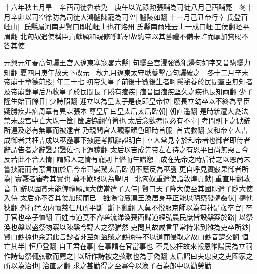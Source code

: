 十六年秋七月旱　辛酉司徒魯恭免　庚午以光祿勲張酺為司徒八月己酉酺薨　冬十月辛卯以司空徐防為司徒大鴻臚陳寵為司空|{
	臚陵如翻}
十一月己丑帝行幸氏登百岯山|{
	氏縣屬河南尹賢曰即柏岯山也在洛州氏縣南爾雅云山一成曰岯工侯翻岯平眉翻}
北匈奴遣使稱臣貢獻願和親修呼韓邪故約帝以其舊禮不備未許而厚加賞賜不答其使

元興元年春高句驪王宫入遼東塞寇畧六縣|{
	句驪至宫浸強數犯邊句如字又音駒驪力知翻}
夏四月庚午赦天下改元　秋九月遼東太守耿夔擊高句驪破之　冬十二月辛未帝崩于章德前殿|{
	年二十七}
初帝失皇子前後十數後生者輒隱袐養於民間羣臣無知者及帝崩鄧皇后乃收皇子於民間長子勝有痼疾|{
	痼音固痼疾堅久之疾也長知兩翻}
少子隆生始百餘日|{
	少詩照翻}
迎立以為皇太子是夜即皇帝位|{
	廢長立幼卒以不終為羣臣疑勝疾非痼周章有異謀張本}
尊皇后曰皇太后太后臨朝|{
	朝直遥翻}
是時新遭大憂法禁未設宫中亡大珠一箧|{
	箧詰恊翻竹笥也}
太后念欲考問必有不辜|{
	考問則下之獄辭所連及必有無辜而被逮者}
乃親閲宫人觀察顔色即時首服|{
	首式救翻}
又和帝幸人吉成御者共枉吉成以巫蠱事下掖庭考訊辭證明白|{
	幸人常見幸於和帝者也御者即侍者辭謂告者之辭證謂證佐也下遐稼翻}
太后以吉成先帝左右待之有恩平日尚無惡言今反若此不合人情|{
	謂婦人之情有寵則上僭而生譛愬吉成在先帝之時后待之以恩尚未嘗挟寵而有惡言加於后今帝已晏駕太后臨朝不應反為巫蠱}
更自呼見實覈果御者所為|{
	實覈者審考其實也}
莫不歎服以為聖明　北匈奴重遣使詣敦煌貢獻|{
	重直用翻敦音屯}
辭以國貧未能備禮願請大使當遣子入侍|{
	賢曰天子降大使至其國即遣子隨大使入侍}
太后亦不答其使加賜而已　雒陽令廣漢王渙居身平正能以明察發擿姦伏|{
	擿他狄翻}
外行猛政内懷慈仁凡所平斷|{
	斷下亂翻}
人莫不悦服京師以為有神是歲卒官|{
	卒于官也卒子恤翻}
百姓市道莫不咨嗟流涕渙喪西歸道經弘農民庶皆設槃案於路|{
	以祭渙也槃以盛祭物案以陳槃今野人之祭猶然}
吏問其故咸言平常持米到雒為吏卒所鈔|{
	賢曰鈔掠也余謂此言鈔者非至如盜賊之鈔掠特不以道而侵取之故曰鈔音楚交翻}
恒亡其半|{
	恒戶登翻}
自王君在事|{
	在事謂在官當事也}
不見侵枉故來報恩雒陽民為立祠作詩每祭輒弦歌而薦之|{
	以所作詩被之弦歌也為于偽翻}
太后詔曰夫忠良之吏國家之所以為治也|{
	治直之翻}
求之甚勤得之至寡今以渙子石為郎中以勸勞勤

